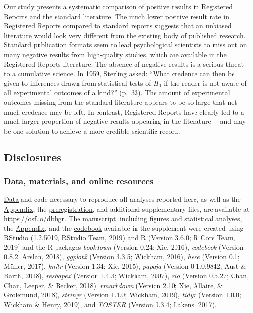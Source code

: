 \documentclass[british,,jou,floatsintext]{apa6}
\begin{document}
Our study presents a systematic comparison of positive results in Registered Reports and the standard literature.
The much lower positive result rate in Registered Reports compared to standard reports suggests that an unbiased literature would look very different from the existing body of published research.
Standard publication formats seem to lead psychological scientists to miss out on many negative results from high-quality studies, which are available in the Registered-Reports literature.
The absence of negative results is a serious threat to a cumulative science.
In 1959, Sterling asked: \enquote{What credence can then be given to inferences drawn from statistical tests of \(H_0\) if the reader is not aware of all experimental outcomes of a kind?} (p.~33).
The amount of experimental outcomes missing from the standard literature appears to be so large that not much credence may be left.
In contrast, Registered Reports have clearly led to a much larger proportion of negative results appearing in the literature\(\,\)---\(\,\)and may be one solution to achieve a more credible scientific record.

\hypertarget{disclosures}{%
\subsection{Disclosures}\label{disclosures}}

\hypertarget{data-materials-and-online-resources}{%
\subsubsection{Data, materials, and online resources}\label{data-materials-and-online-resources}}

\href{https://osf.io/aqr2s/}{Data} and code necessary to reproduce all analyses reported here, as well as the \href{https://osf.io/qw798/}{Appendix}, the \href{https://osf.io/sy927/}{preregistration}, and additional supplementary files, are available at \url{https://osf.io/dbhgr}.
The manuscript, including figures and statistical analyses, the \href{https://osf.io/qw798/}{Appendix}, and the \href{https://osf.io/6jrkz/}{codebook} available in the supplement were created using RStudio (1.2.5019, RStudio Team, 2019) and R (Version 3.6.0; R Core Team, 2019) and the R-packages \emph{bookdown} (Version 0.24; Xie, 2016), \emph{codebook} (Version 0.8.2; Arslan, 2018), \emph{ggplot2} (Version 3.3.5; Wickham, 2016), \emph{here} (Version 0.1; Müller, 2017), \emph{knitr} (Version 1.34; Xie, 2015), \emph{papaja} (Version 0.1.0.9842; Aust \& Barth, 2018), \emph{reshape2} (Version 1.4.3; Wickham, 2007), \emph{rio} (Version 0.5.27; Chan, Chan, Leeper, \& Becker, 2018), \emph{rmarkdown} (Version 2.10; Xie, Allaire, \& Grolemund, 2018), \emph{stringr} (Version 1.4.0; Wickham, 2019), \emph{tidyr} (Version 1.0.0; Wickham \& Henry, 2019), and \emph{TOSTER} (Version 0.3.4; Lakens, 2017).
\end{document}
